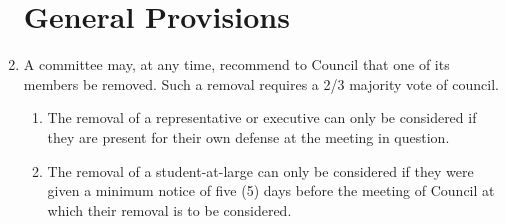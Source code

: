 \documentclass[oneside]{book}
\begin{document}
\begin{enumerate}
\section{\label{Committees_General_Provisions}General Provisions }
\item A committee may, at any time, recommend to Council that one of its members be removed. 
Such a removal requires a 2/3 majority vote of council.
\begin{enumerate}
\item The removal of a representative or executive can only be considered if they are 
present for their own defense at the meeting in question.
\item The removal of a student-at-large can only be considered if they were given a 
minimum notice of five (5) days before the meeting of Council at which their removal is to be considered.
\end{enumerate}


\end{enumerate}
\end{document}
